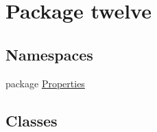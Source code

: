 \hypertarget{namespacetwelve}{}\section{Package twelve}
\label{namespacetwelve}
\subsection*{Namespaces}
\begin{DoxyCompactItemize}
\item 
package \hyperlink{namespacetwelve_1_1_properties}{Properties}
\end{DoxyCompactItemize}
\subsection*{Classes}
